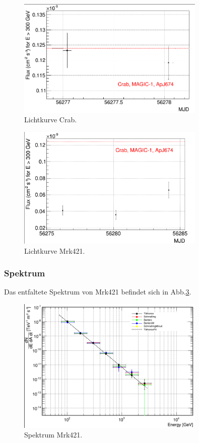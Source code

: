 \begin{figure}
    \centering
    \includegraphics[width=0.8\textwidth]{./Plots/04_MrkAnalyse/Datenset4/Datenset4_LC_Crab.png}
    \caption{Lichtkurve Crab.}
    \label{Datenset4_LC_Crab}
\end{figure}

\begin{figure}
    \centering
    \includegraphics[width=0.8\textwidth]{./Plots/04_MrkAnalyse/Datenset4/Datenset4_LC_Mrk421.png}
    \caption{Lichtkurve Mrk421.}
    \label{Datenset4_LC_Mrk421}
\end{figure}


\subsubsection{Spektrum}
Das entfaltete Spektrum von Mrk421 befindet sich in Abb.\ref{Datenset4_Spektrum_Mrk421}.

\begin{figure}
    \centering
    \includegraphics[width=0.8\textwidth]{./Plots/04_MrkAnalyse/Datenset4/Datenset4_Spektrum_Mrk421.png}
    \caption{Spektrum Mrk421.}
    \label{Datenset4_Spektrum_Mrk421}
\end{figure}

